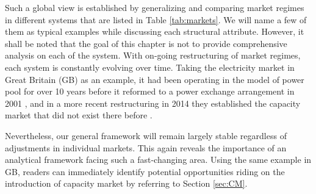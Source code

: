 Such a global view is established by generalizing and comparing market regimes in different systems that are listed in Table \ref{tab:markets}. We will name a few of them as typical examples while discussing each structural attribute. However, it shall be noted that the goal of this chapter is not to provide comprehensive analysis on each of the system. With on-going restructuring of market regimes, each system is constantly evolving over time. Taking the electricity market in Great Britain (GB) as an example, it had been operating in the model of power pool for over 10 years before it reformed to a power exchange arrangement in 2001 \cite{Rebours2009,FrontierEconomics2016,ofgem_m}, and in a more recent restructuring in 2014 they established the capacity market that did not exist there before \cite{ofgem_cm}. 

Nevertheless, our general framework will remain largely stable regardless of adjustments in individual markets. This again reveals the importance of an analytical framework facing such a fast-changing area. Using the same example in GB, readers can immediately identify potential opportunities riding on the introduction of capacity market by referring to Section \ref{sec:CM}.


